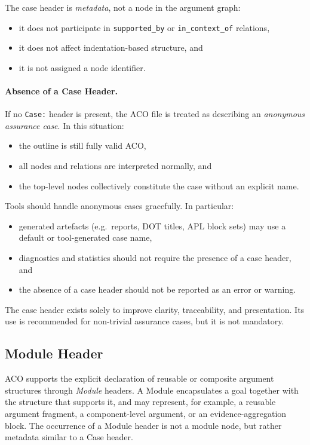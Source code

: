 \documentclass[11pt]{article}
\begin{document}
The case header is \emph{metadata}, not a node in the argument graph:
\begin{itemize}[leftmargin=2em]
  \item it does not participate in \texttt{supported\_by} or \texttt{in\_context\_of} relations,
  \item it does not affect indentation-based structure, and
  \item it is not assigned a node identifier.
\end{itemize}

\paragraph{Absence of a Case Header.}
If no \texttt{Case:} header is present, the ACO file is treated as describing an
\emph{anonymous assurance case}. In this situation:
\begin{itemize}[leftmargin=2em]
  \item the outline is still fully valid ACO,
  \item all nodes and relations are interpreted normally, and
  \item the top-level nodes collectively constitute the case without an explicit name.
\end{itemize}

Tools should handle anonymous cases gracefully. In particular:
\begin{itemize}[leftmargin=2em]
  \item generated artefacts (e.g.\ reports, DOT titles, APL block sets) may use
        a default or tool-generated case name,
  \item diagnostics and statistics should not require the presence of a case header, and
  \item the absence of a case header should not be reported as an error or warning.
\end{itemize}

The case header exists solely to improve clarity, traceability, and presentation.
Its use is recommended for non-trivial assurance cases, but it is not mandatory.

\subsection{Module Header}

ACO supports the explicit declaration of reusable or composite argument structures through
\emph{Module} headers. A Module encapsulates a goal together with the structure that supports it,
and may represent, for example, a reusable argument fragment, a component-level argument,
or an evidence-aggregation block.
The occurrence of a Module header is not a module node, but rather metadata similar to a Case header.
\end{document}
